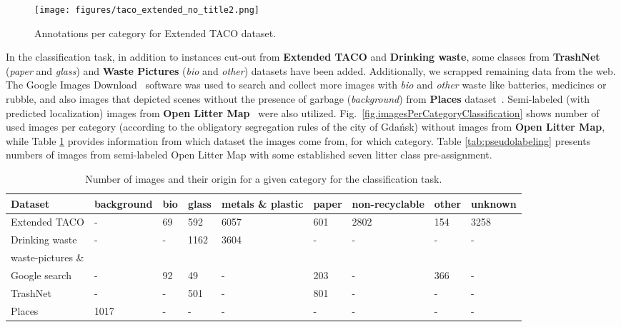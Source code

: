 \documentclass{article}
\begin{document}
\begin{figure}[!ht]
\centering
  \texttt{[image: figures/taco\_extended\_no\_title2.png]}\caption{Annotations per category for Extended TACO dataset.\label{fig.extendedTACO}}
\end{figure}


In the classification task, in addition to instances cut-out from \textbf{Extended TACO} and \textbf{Drinking waste}, some classes from \textbf{TrashNet} (\textit{paper} and \textit{glass}) and \textbf{Waste Pictures} (\textit{bio} and \textit{other}) datasets have been added. Additionally, we scrapped remaining data from the web. The Google Images Download~\cite{google-images-download2019} software was used to search and collect more images with \textit{bio} and \textit{other} waste like batteries, medicines or rubble, and also images that depicted scenes without the presence of garbage (\textit{background}) from \textbf{Places} dataset~\cite{places}. Semi-labeled (with predicted localization) images from \textbf{Open Litter Map}~\cite{openlittermap2018} were also utilized. Fig.~\ref{fig.imagesPerCategoryClassification} shows number of used images per category (according to the obligatory segregation rules of the city of Gdańsk) without images from \textbf{Open Litter Map}, while Table \ref{tab:source_classification} provides information from which dataset the images come from, for which category. Table \ref{tab:pseudolabeling} presents numbers of images from semi-labeled Open Litter Map with some established seven litter class pre-assignment.


{
\begin{table}[!hbt]
\centering
\caption{Number of images and their origin for a given category for the classification task.}
\label{tab:source_classification}
\begin{tabular}{lllllllll}
\hline
\textbf{Dataset}    &\textbf{background}    &\textbf{bio}   &\textbf{glass} &\textbf{metals \& plastic}      &\textbf{paper} &\textbf{non-recyclable}  &\textbf{other} &\textbf{unknown} \\ \hline
Extended TACO   &-  &69  &592  &6057  &601  &2802  &154  &3258 \\
Drinking waste &-   &-  &1162   &3604   &-  &-  &-  &- \\
waste-pictures \& \\ Google search &-  &92 &49 &-  &203    &-  &366    &- \\
TrashNet    &-  &-  &501    &-  &801    &-  &-  &-\\
Places  &1017   &-  &-  &-  &-  &-  &-  &-\\ \hline
\end{tabular}
\end{table}
}
\end{document}
